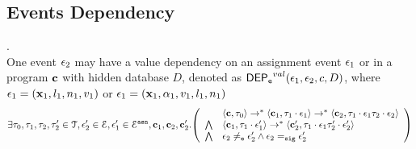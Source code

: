 %
%
%
\subsection{Events Dependency}
%
%
\begin{defn}
\label{def:event_valdep}.
\\
One event $\mathtt{\epsilon}_2$ may have a value dependency on an assignment event $\mathtt{\epsilon}_1$ or 
in a program ${\boldsymbol{\mathbf{c}}}$
with hidden database $D$, denoted as 
%
$\mathsf{DEP_{\mathtt{e}}}^{val}(\mathtt{\epsilon}_1, \mathtt{\epsilon}_2, c, D)$, where $\mathtt{\epsilon}_1 = ({\boldsymbol{\mathbf{x}}}_1, l_1, n_1, v_1) $ or 
$\mathtt{\epsilon}_1 = ({\boldsymbol{\mathbf{x}}}_1, \alpha_1, v_1, l_1, n_1)$
%
\[
\exists \vtrace_0,
\vtrace_1, \vtrace_2, \vtrace_2' \in \mathcal{T}, \event_2' \in \eventset, \event_1' \in \eventset^{\asn}, \ssa{c}_1, \ssa{c}_2,  \ssa{c}_2'.
  \left(
  \begin{array}{ll}   
 & \config{\ssa{c}, \vtrace_0} \rightarrow^{*} 
\config{\ssa{c}_1, \vtrace_1 \cdot \event_1}  \rightarrow^{*} 
  \config{\ssa{c}_2,  \vtrace_1 \cdot \event_1 \vtrace_2 \cdot \event_2 } 
 \\ 
 \bigwedge &
  \config{\ssa{c}_1, \vtrace_1 \cdot \event_1'}  \rightarrow^{*} 
  \config{\ssa{c}_2',  \vtrace_1 \cdot \event_1 \vtrace_2' \cdot \event_2' } 
\\
\bigwedge &
\event_2 \eventneq \event_2' \land \event_2 \sigeq \event_2'
\end{array}
\right)
 \]
%
\end{defn}
%

